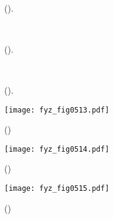   \begin{figure}[hb!] %
    \centering
     \\
    \caption{
             (\cite[s.~601]{Feynman01}).}
    \label{fyz:fig0510}
  \end{figure}

  \begin{figure}[hb!] %
    \centering
     \\
    \caption{
             (\cite[s.~601]{Feynman01}).}
    \label{fyz:fig0511}
  \end{figure}

  \begin{figure}[hb!] %
    \centering
     \\
    \caption{
             (\cite[s.~601]{Feynman01}).}
    \label{fyz:fig0512}
  \end{figure}

  \begin{figure}[ht!] %
    \centering
    \texttt{[image: fyz\_fig0513.pdf]}
    \caption{
             (\cite[s.~697]{Feynman01})}
    \label{fyz:fig0513}
  \end{figure}

  \begin{figure}[ht!] %
    \centering
    \texttt{[image: fyz\_fig0514.pdf]}
    \caption{
             (\cite[s.~697]{Feynman01})}
    \label{fyz:fig0514}
  \end{figure}

  \begin{figure}[ht!] %
    \centering
    \texttt{[image: fyz\_fig0515.pdf]}
    \caption{
             (\cite[s.~697]{Feynman01})}
    \label{fyz:fig0515}
  \end{figure}
 
